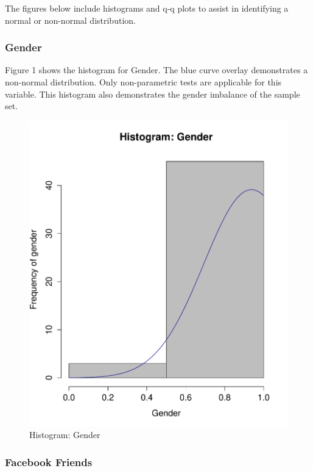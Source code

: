 The figures below include histograms and q-q plots to assist in identifying a normal or non-normal distribution.

\subsubsection{Gender}

Figure 1 shows the histogram for Gender. The blue curve overlay demonstrates a non-normal distribution. Only non-parametric tests are applicable for this variable. This histogram also demonstrates the gender imbalance of the sample set.


\begin{figure}[H]
\centering
\caption{Histogram: Gender}
\includegraphics[scale=0.35]{./img/hist_gender.pdf}
\end{figure}

\subsubsection{Facebook Friends}

